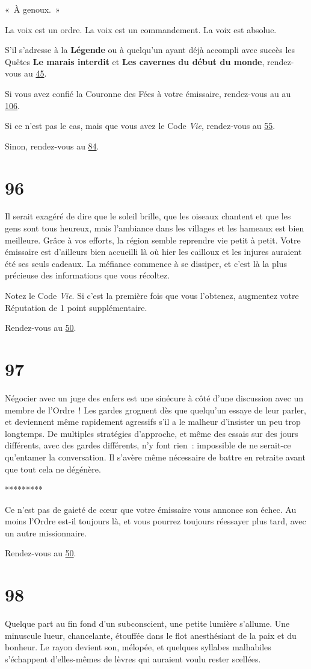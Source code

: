 \documentclass{report}
\newcommand{\gsection}[1]{
    \section{#1}
    \label{section-#1}
}
\newcommand{\glink}[1]{\hyperref[section-#1]{#1}}
\newcommand{\ellipse}{
    \begin{center}
        *********
    \end{center}
}
\newcommand{\hero}[1]{\textbf{#1}}
\begin{document}
« À genoux. »

La voix est un ordre. La voix est un commandement. La voix est absolue.

S'il s'adresse à la \hero{Légende} ou à quelqu'un ayant déjà accompli avec succès les Quêtes \textbf{Le marais interdit} et \textbf{Les cavernes du début du monde}, rendez-vous au \glink{45}.

Si vous avez confié la Couronne des Fées à votre émissaire, rendez-vous au au \glink{106}.

Si ce n'est pas le cas, mais que vous avez le Code \emph{Vie}, rendez-vous au \glink{55}.

Sinon, rendez-vous au \glink{84}.

\gsection{96}

Il serait exagéré de dire que le soleil brille, que les oiseaux chantent et que les gens sont tous heureux, mais l'ambiance dans les villages et les hameaux est bien meilleure. Grâce à vos efforts, la région semble reprendre vie petit à petit. Votre émissaire est d'ailleurs bien accueilli là où hier les cailloux et les injures auraient été ses seuls cadeaux. La méfiance commence à se dissiper, et c'est là la plus précieuse des informations que vous récoltez.

Notez le Code \emph{Vie}. Si c'est la première fois que vous l'obtenez, augmentez votre Réputation de 1 point supplémentaire.

Rendez-vous au \glink{50}.

\gsection{97}

Négocier avec un juge des enfers est une sinécure à côté d'une discussion avec un membre de l'Ordre ! Les gardes grognent dès que quelqu'un essaye de leur parler, et deviennent même rapidement agressifs s'il a le malheur d'insister un peu trop longtemps. De multiples stratégies d'approche, et même des essais sur des jours différents, avec des gardes différents, n'y font rien : impossible de ne serait-ce qu'entamer la conversation. Il s'avère même nécessaire de battre en retraite avant que tout cela ne dégénère.

\ellipse

Ce n'est pas de gaieté de cœur que votre émissaire vous annonce son échec. Au moins l'Ordre est-il toujours là, et vous pourrez toujours réessayer plus tard, avec un autre missionnaire.

Rendez-vous au \glink{50}.

\gsection{98}

Quelque part au fin fond d'un subconscient, une petite lumière s'allume. Une minuscule lueur, chancelante, étouffée dans le flot anesthésiant de la paix et du bonheur. Le rayon devient son, mélopée, et quelques syllabes malhabiles s'échappent d'elles-mêmes de lèvres qui auraient voulu rester scellées.
\end{document}

